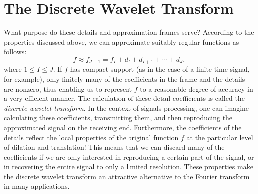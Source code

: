 \section*{The Discrete Wavelet Transform}

What purpose do these details and approximation frames serve? According to the
properties discussed above, we can approximate suitably regular functions as follows:
\begin{equation*}
f \approx f_{J+1} = f_{I} + d_{I} + d_{I+1} + \cdots + d_J,
\end{equation*}
where $1 \leq I \leq J$. If $f$ has compact support (as in the case of a finite-time signal,
for example), only finitely many of the coefficients in the frame and the details are
nonzero, thus enabling us to represent $f$ to a reasonable degree of accuracy in a very 
efficient manner. The calculation of these detail coefficients is called the \emph{discrete
wavelet transform}. In the context of signals processing, one can imagine calculating these
coefficients, transmitting them, and then reproducing the approximated signal on the
receiving end. Furthermore, the coefficients of the details reflect the local properties
of the original function $f$ at the particular level of dilation and translation! This means
that we can discard many of the coefficients if we are only interested in reproducing a certain
part of the signal, or in recovering the entire signal to only a limited resolution. These 
properties make the discrete wavelet transform an attractive alternative to the Fourier
transform in many applications. 

